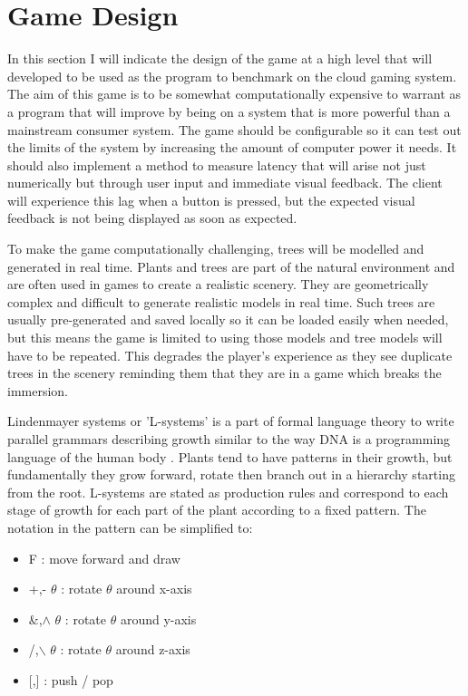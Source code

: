 \section{Game Design}
In this section I will indicate the design of the game at a high level that will developed to be used as the program to benchmark on the cloud gaming system. The aim of this game is to be somewhat computationally expensive to warrant as a program that will improve by being on a system that is more powerful than a mainstream consumer system. The game should be configurable so it can test out the limits of the system by increasing the amount of computer power it needs. It should also implement a method to measure latency that will arise not just numerically but through user input and immediate visual feedback. The client will experience this lag when a button is pressed, but the expected visual feedback is not being displayed as soon as expected.
\newline
\par
To make the game computationally challenging, trees will be modelled and generated in real time. Plants and trees are part of the natural environment and are often used in games to create a realistic scenery. They are geometrically complex and difficult to generate realistic models in real time. Such trees are usually pre-generated and saved locally so it can be loaded easily when needed, but this means the game is limited to using those models and tree models will have to be repeated. This degrades the player's experience as they see duplicate trees in the scenery reminding them that they are in a game which breaks the immersion.
\newline
\par
Lindenmayer systems or 'L-systems' is a part of formal language theory to write parallel grammars describing growth similar to the way DNA is a programming language of the human body \cite{prusinkiewicz2012algorithmic}. Plants tend to have patterns in their growth, but fundamentally they grow forward, rotate then branch out in a hierarchy starting from the root. L-systems are stated as production rules and correspond to each stage of growth for each part of the plant according to a fixed pattern. The notation in the pattern can be simplified to:
\begin{itemize}
 \item F 	:	move forward and draw
 \item +,- \(\theta\)	:	rotate \(\theta\) around x-axis
 \item \&,\(\wedge\) \(\theta\)	:	rotate \(\theta\) around y-axis
 \item /,\(\backslash\) \(\theta\)	:	rotate \(\theta\) around z-axis
 \item {[,]}	:	push / pop
\end{itemize}

